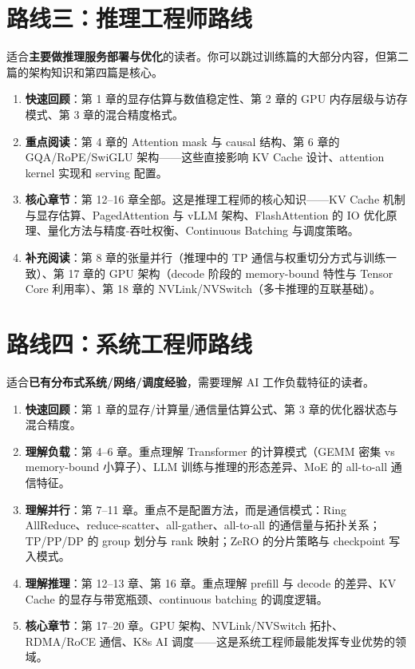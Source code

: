 \section*{路线三：推理工程师路线}

适合\textbf{主要做推理服务部署与优化}的读者。你可以跳过训练篇的大部分内容，但第二篇的架构知识和第四篇是核心。

\begin{enumerate}
\item \textbf{快速回顾}：第 1 章的显存估算与数值稳定性、第 2 章的 GPU 内存层级与访存模式、第 3 章的混合精度格式。
\item \textbf{重点阅读}：第 4 章的 Attention mask 与 causal 结构、第 6 章的 GQA/RoPE/SwiGLU 架构——这些直接影响 KV Cache 设计、attention kernel 实现和 serving 配置。
\item \textbf{核心章节}：第 12--16 章全部。这是推理工程师的核心知识——KV Cache 机制与显存估算、PagedAttention 与 vLLM 架构、FlashAttention 的 IO 优化原理、量化方法与精度-吞吐权衡、Continuous Batching 与调度策略。
\item \textbf{补充阅读}：第 8 章的张量并行（推理中的 TP 通信与权重切分方式与训练一致）、第 17 章的 GPU 架构（decode 阶段的 memory-bound 特性与 Tensor Core 利用率）、第 18 章的 NVLink/NVSwitch（多卡推理的互联基础）。
\end{enumerate}

\section*{路线四：系统工程师路线}

适合\textbf{已有分布式系统/网络/调度经验}，需要理解 AI 工作负载特征的读者。

\begin{enumerate}
\item \textbf{快速回顾}：第 1 章的显存/计算量/通信量估算公式、第 3 章的优化器状态与混合精度。
\item \textbf{理解负载}：第 4--6 章。重点理解 Transformer 的计算模式（GEMM 密集 vs memory-bound 小算子）、LLM 训练与推理的形态差异、MoE 的 all-to-all 通信特征。
\item \textbf{理解并行}：第 7--11 章。重点不是配置方法，而是通信模式：Ring AllReduce、reduce-scatter、all-gather、all-to-all 的通信量与拓扑关系；TP/PP/DP 的 group 划分与 rank 映射；ZeRO 的分片策略与 checkpoint 写入模式。
\item \textbf{理解推理}：第 12--13 章、第 16 章。重点理解 prefill 与 decode 的差异、KV Cache 的显存与带宽瓶颈、continuous batching 的调度逻辑。
\item \textbf{核心章节}：第 17--20 章。GPU 架构、NVLink/NVSwitch 拓扑、RDMA/RoCE 通信、K8s AI 调度——这是系统工程师最能发挥专业优势的领域。
\end{enumerate}

